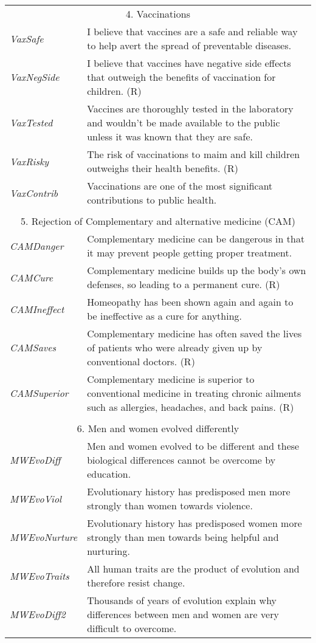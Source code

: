\documentclass[fignum,man]{apa}\usepackage[]{graphicx}\usepackage[]{color}
\begin{document}
\begin{longtable}{p{.2\linewidth} p{.8\linewidth}}
	\multicolumn{2}{c}{4. Vaccinations}\\
	\nopagebreak
	\hline
	\nopagebreak
	\emph{VaxSafe} & I believe that vaccines are a safe and reliable way to
	help avert the spread of preventable diseases. \\
	\emph{VaxNegSide} & I believe that vaccines have negative side effects that
	outweigh the benefits of vaccination for children. (R) \\
	\emph{VaxTested} & Vaccines are thoroughly tested in the laboratory and
	wouldn't be made available to the public unless it was
	known that they are safe. \\
	\emph{VaxRisky} &The risk of vaccinations to maim and kill children
	outweighs their health benefits. (R)  \\
	\emph{VaxContrib} & Vaccinations are one of the most significant
	contributions to public health. \\
	\hline	
	
	\\
\hline
\multicolumn{2}{c}{5. Rejection of Complementary and alternative medicine (CAM)}\\
\nopagebreak
\hline
\nopagebreak
\emph{CAMDanger} & Complementary medicine can be dangerous in that it may prevent people getting proper treatment.\\
\emph{CAMCure} & Complementary medicine builds up the body's own defenses, so leading to a permanent cure. (R)\\
\emph{CAMIneffect} & Homeopathy has been shown again and again to be ineffective as a cure for anything.\\
\emph{CAMSaves} & Complementary medicine has often saved the lives of patients who were already given up by conventional doctors. (R)\\
\emph{CAMSuperior} & Complementary medicine is superior to conventional medicine in treating chronic ailments such as allergies, headaches, and back pains. (R)\\

	\\
\hline
\multicolumn{2}{c}{6. Men and women evolved differently}\\
\nopagebreak
\hline
\nopagebreak
\emph{MWEvoDiff} & Men and women evolved to be different and these biological differences cannot be overcome by education.\\
\emph{MWEvoViol} & Evolutionary history has predisposed men more strongly than women towards violence.\\
\emph{MWEvoNurture} & Evolutionary history has predisposed women more strongly than men towards being helpful and nurturing.\\
\emph{MWEvoTraits} & All human traits are the product of evolution and therefore resist change.\\
\emph{MWEvoDiff2} & Thousands of years of evolution explain why differences between men and women are very difficult to overcome.\\


\end{longtable}
\end{document}
